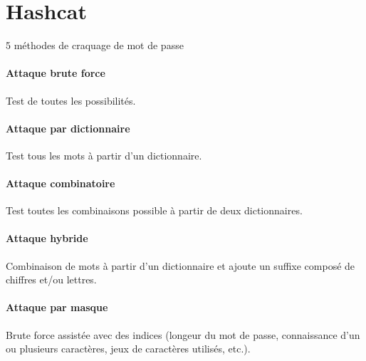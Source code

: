 \section{Hashcat}
5 méthodes de craquage de mot de passe
\paragraph{Attaque brute force}
Test de toutes les possibilités.

\paragraph{Attaque par dictionnaire}
Test tous les mots à partir d'un dictionnaire.

\paragraph{Attaque combinatoire}
Test toutes les combinaisons possible à partir de deux dictionnaires.

\paragraph{Attaque hybride}
Combinaison de mots à partir d'un dictionnaire et ajoute un suffixe composé de chiffres et/ou lettres.

\paragraph{Attaque par masque}
Brute force assistée avec des indices (longeur du mot de passe, connaissance d'un ou plusieurs caractères, jeux de caractères utilisés, etc.).
